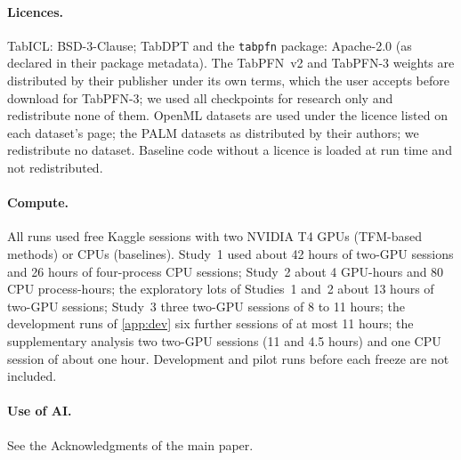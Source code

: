 \paragraph{Licences.} TabICL: BSD-3-Clause; TabDPT and the \texttt{tabpfn} package: Apache-2.0 (as declared in their
package metadata). The TabPFN~v2 and TabPFN-3 weights are distributed by their publisher under its own terms, which the
user accepts before download for TabPFN-3; we used all checkpoints for research only and redistribute none of them.
OpenML datasets are used under the licence listed on each dataset's page; the PALM datasets as distributed by their
authors; we redistribute no dataset. Baseline code without a licence is loaded at run time and not redistributed.

\paragraph{Compute.} All runs used free Kaggle sessions with two NVIDIA T4 GPUs (TFM-based methods) or CPUs (baselines).
Study~1 used about 42 hours of two-GPU sessions and 26 hours of four-process CPU sessions; Study~2 about 4 GPU-hours
and 80 CPU process-hours; the exploratory lots of Studies~1 and~2 about 13 hours of two-GPU sessions; Study~3 three
two-GPU sessions of 8 to 11 hours; the development runs of \cref{app:dev} six further sessions of at most 11 hours; the
supplementary analysis two two-GPU sessions (11 and 4.5 hours) and one CPU session of about one hour. Development and
pilot runs before each freeze are not included.

\paragraph{Use of AI.} See the Acknowledgments of the main paper.
